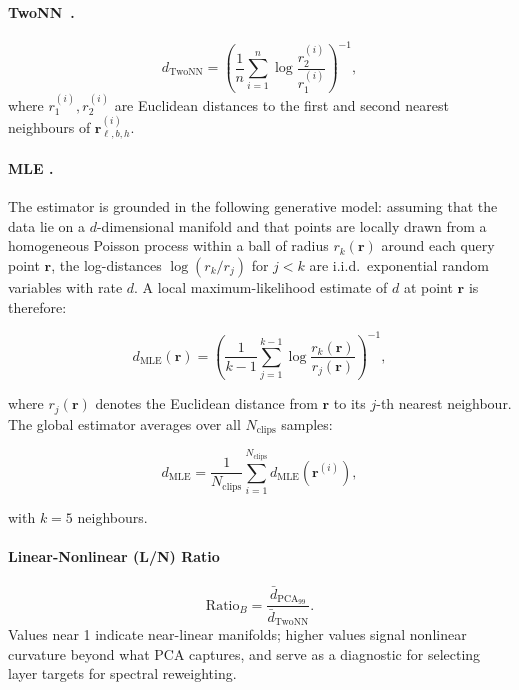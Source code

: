 \paragraph{TwoNN~\cite{twonn}.}
\begin{equation}
    d_{\mathrm{TwoNN}}
    = \left(\frac{1}{n}\sum_{i=1}^{n}\log\frac{r_2^{(i)}}{r_1^{(i)}}\right)^{-1},
    \label{eq:twonn}
\end{equation}
where $r_1^{(i)}, r_2^{(i)}$ are Euclidean distances to the first and second nearest neighbours of
$\mathbf{r}_{\ell,b,h}^{(i)}$.

\paragraph{MLE \cite{mle}.}
The estimator is grounded in the following generative model: assuming that the data lie on a
$d$-dimensional manifold and that points are locally drawn from a homogeneous Poisson process
within a ball of radius $r_k(\mathbf{r})$ around each query point $\mathbf{r}$, the
log-distances $\log(r_k / r_j)$ for $j < k$ are i.i.d.\ exponential random variables with rate
$d$. A local maximum-likelihood estimate of $d$ at point $\mathbf{r}$ is therefore:

\begin{equation}
    d_{\mathrm{MLE}}(\mathbf{r})
    = \left(\frac{1}{k-1}\sum_{j=1}^{k-1}\log\frac{r_k(\mathbf{r})}{r_j(\mathbf{r})}\right)^{-1},
\label{eq:mle}
\end{equation}

where $r_j(\mathbf{r})$ denotes the Euclidean distance from $\mathbf{r}$ to its $j$-th
nearest neighbour. The global estimator averages over all $N_{\text{clips}}$ samples:

\begin{equation}
    d_{\mathrm{MLE}}
    = \frac{1}{N_{\text{clips}}}\sum_{i=1}^{N_{\text{clips}}} d_{\mathrm{MLE}}\!\left(\mathbf{r}^{(i)}\right),
\label{eq:mle_global}
\end{equation}

with $k = 5$ neighbours.

\paragraph{Linear-Nonlinear (L/N) Ratio}
\begin{equation}
    \mathrm{Ratio}_B
    = \frac{\bar{d}_{\mathrm{PCA}_{99}}}{\bar{d}_{\mathrm{TwoNN}}}.
    \label{eq:ln_ratio}
\end{equation}
Values near 1 indicate near-linear manifolds; higher values signal nonlinear curvature beyond what
PCA captures, and serve as a diagnostic for selecting layer targets for spectral reweighting.

